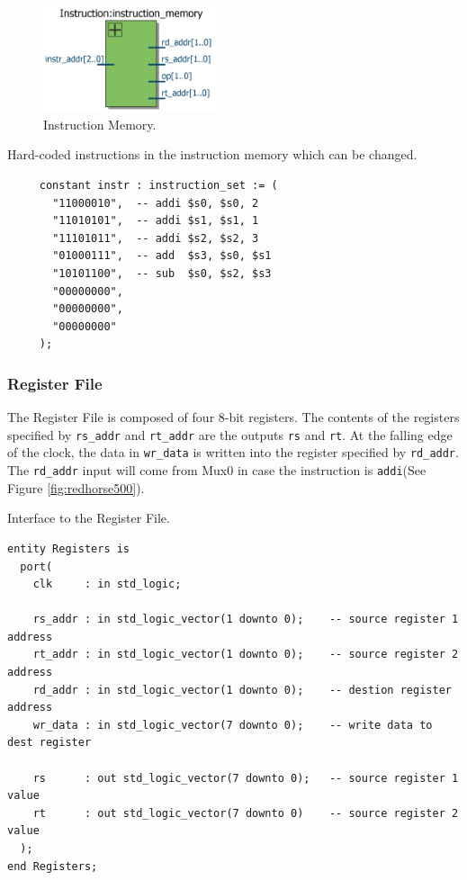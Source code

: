 \documentclass[a4paper, 11pt,oneside]{article}
\begin{document}
\begin{figure}[H]
	\begin{center}
	\includegraphics[width=2in]{im.png}
	\caption{Instruction Memory.}
	\label{fig:im} 
	\end{center}
\end{figure}

\begin{listing}[H]
\caption{Hard-coded instructions in the instruction memory which can be 
changed.}
\label{code:im_code}
\begin{verbatim}
     constant instr : instruction_set := (
       "11000010",  -- addi $s0, $s0, 2
       "11010101",  -- addi $s1, $s1, 1
       "11101011",  -- addi $s2, $s2, 3
       "01000111",  -- add  $s3, $s0, $s1
       "10101100",  -- sub  $s0, $s2, $s3
       "00000000",
       "00000000",
       "00000000"
     );    
\end{verbatim}
\end{listing}


\subsubsection{Register File}
The Register File is composed of four 8-bit registers. The contents of the 
registers specified by \texttt{rs_addr} and 
\texttt{rt_addr} are the outputs \texttt{rs} and 
\texttt{rt}. At the falling edge of the clock, the data in 
\texttt{wr_data} is written into the register 
specified by \texttt{rd_addr}. The \texttt{rd_addr} input 
will come from Mux0 in case the instruction is \texttt{addi}(See 
Figure \ref{fig:redhorse500}).


\begin{listing}[H]
\caption{Interface to the Register File.}
\label{code:rf}
\begin{verbatim}
entity Registers is
  port(
    clk     : in std_logic;

    rs_addr : in std_logic_vector(1 downto 0);    -- source register 1 address
    rt_addr : in std_logic_vector(1 downto 0);    -- source register 2 address
    rd_addr : in std_logic_vector(1 downto 0);    -- destion register address
    wr_data : in std_logic_vector(7 downto 0);    -- write data to dest register

    rs      : out std_logic_vector(7 downto 0);   -- source register 1 value
    rt      : out std_logic_vector(7 downto 0)    -- source register 2 value
  );
end Registers;

\end{verbatim}
\end{listing}
\end{document}
